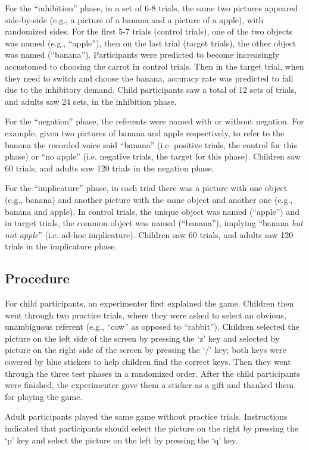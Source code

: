 \documentclass[10pt,letterpaper]{article}
\begin{document}
For the ``inhibition'' phase, in a set of 6-8 trials, the same two pictures appeared side-by-side (e.g., a picture of a banana and a picture of a apple), with randomized sides. For the first 5-7 trials (control trials), one of the two objects was named (e.g., ``apple''), then on the last trial  (target trials), the other object was named (``banana''). Participants were predicted to become increasingly accustomed to choosing the carrot in control trials. Then in the target trial, when they need to switch and choose the banana, accuracy rate was predicted to fall due to the inhibitory demand. Child participants saw a total of 12 sets of trials, and adults saw 24 sets, in the inhibition phase.

For the ``negation'' phase, the referents were named with or without negation. For example, given two pictures of banana and apple respectively, to refer to the banana the recorded voice said ``banana'' (i.e. positive trials, the control for this phase) or ``no apple'' (i.e. negative trials, the target for this phase). Children saw 60 trials, and adults saw 120 trials in the negation phase. 

For the ``implicature'' phase, in each trial there was a picture with one object (e.g., banana) and another picture with the same object and another one (e.g., banana and apple). In control trials, the unique object was named (``apple'') and in target trials, the common object was named (``banana''), implying ``banana \emph{but not apple}'' (i.e. ad-hoc implicature). Children saw 60 trials, and adults saw 120 trials in the implicature phase.  

\subsection{Procedure}

For child participants, an experimenter first explained the game.  Children then went through two practice trials, where they were asked to select an obvious, unambiguous referent (e.g., ``cow'' as opposed to ``rabbit'').  Children selected the picture on the left side of the screen by pressing the `z' key and selected by picture on the right side of the screen by pressing the `/' key; both keys were covered by blue stickers to help children find the correct keys. Then they went through the three test phases in a randomized order.  After the child participants were finished, the experimenter gave them a sticker as a gift and thanked them for playing the game.

Adult participants played the same game without practice trials.  Instructions indicated that participants should select the picture on the right by pressing the `p' key and select the picture on the left by pressing the `q' key.  
\end{document}

